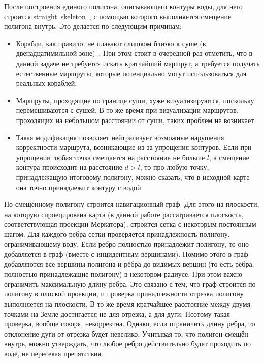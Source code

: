 После построения единого полигона, описывающего контуры воды, для него
строится straight~skeleton~\cite{aichholzer1996straight}, с помощью
которого выполняется смещение полигона внутрь. Это делается по
следующим причинам:
\begin{itemize}
    \item Корабли, как правило, не плавают слишком близко к суше (в
      двенадцатимильной зоне)~\cite{o1984international}. При этом стоит в
      очередной раз отметить, что в данной задаче не требуется искать
      кратчайший маршрут, а требуется получать естественные маршруты,
      которые потенциально могут использоваться для реальных кораблей.
    \item Маршруты, проходящие по границе суши, хуже визуализируются,
      поскольку перемешиваются с сушей. В то же время при визуализации
      маршрутов, проходящих на небольшом расстоянии от суши, таких
      проблем не возникает.
    \item Такая модификация позволяет нейтрализует возможные нарушения
      корректности маршрута, возникающие из-за упрощения контуров.
      Если при упрощении любая точка смещается на расстояние не больше
      $l$, а смещение контура происходит на расстояние $d > l$, то про
      любую точку, принадлежащую итоговому полигону, можно сказать,
      что в исходной карте она точно принадлежит контуру с водой.
\end{itemize}

По смещённому полигону строится навигационный граф. Для этого на
плоскости, на которую спроецирована карта (в данной работе
рассатривается плоскость, соответствующая проекции Меркатора),
строится сетка с некоторым постоянным шагом. Для каждого ребра сетки
проверяется принадлежность полигону, ограничивающему воду. Если ребро
полностью принадлежит полигону, то оно добавляется в граф (вместе с
инцидентным вершинами). Помимо этого в граф добавляются все вершины
полигона и рёбра до видимых вершин (то есть рёбра, полностью
принадлежащие полигону) в некотором радиусе. При этом важно ограничить
максимальную длину ребра. Это связано с тем, что граф строится по
полигону в плоской проекции, и проверка принадлежности отрезка
полигону выполняется на плоскости. В то же время кратчайшее расстояние
между двумя точками на Земле достигается не для отрезка, а для дуги.
Поэтому такая проверка, вообще говоря, некорректна. Однако, если
ограничить длину ребра, то отклонение дуги от отрезка будет невелико.
Учитывая то, что полигон смещён внутрь, можно утверждать, что любое
ребро действительно будет проходить по воде, не пересекая препятствия.

